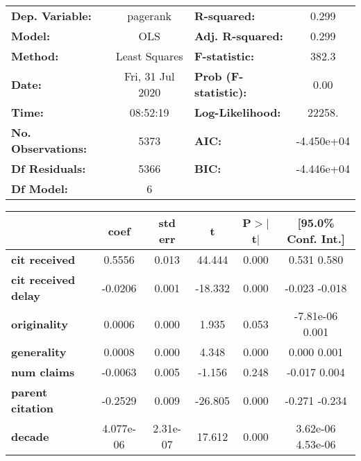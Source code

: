 \begin{center}
\begin{tabular}{lclc}
\toprule
\textbf{Dep. Variable:}     &     pagerank     & \textbf{  R-squared:         } &      0.299    \\
\textbf{Model:}             &       OLS        & \textbf{  Adj. R-squared:    } &      0.299    \\
\textbf{Method:}            &  Least Squares   & \textbf{  F-statistic:       } &      382.3    \\
\textbf{Date:}              & Fri, 31 Jul 2020 & \textbf{  Prob (F-statistic):} &      0.00     \\
\textbf{Time:}              &     08:52:19     & \textbf{  Log-Likelihood:    } &     22258.    \\
\textbf{No. Observations:}  &        5373      & \textbf{  AIC:               } &  -4.450e+04   \\
\textbf{Df Residuals:}      &        5366      & \textbf{  BIC:               } &  -4.446e+04   \\
\textbf{Df Model:}          &           6      & \textbf{                     } &               \\
\bottomrule
\end{tabular}
\begin{tabular}{lccccc}
                            & \textbf{coef} & \textbf{std err} & \textbf{t} & \textbf{P$>$$|$t$|$} & \textbf{[95.0\% Conf. Int.]}  \\
\midrule
\textbf{cit received}       &       0.5556  &        0.013     &    44.444  &         0.000        &         0.531     0.580       \\
\textbf{cit received delay} &      -0.0206  &        0.001     &   -18.332  &         0.000        &        -0.023    -0.018       \\
\textbf{originality}        &       0.0006  &        0.000     &     1.935  &         0.053        &     -7.81e-06     0.001       \\
\textbf{generality}         &       0.0008  &        0.000     &     4.348  &         0.000        &         0.000     0.001       \\
\textbf{num claims}         &      -0.0063  &        0.005     &    -1.156  &         0.248        &        -0.017     0.004       \\
\textbf{parent citation}    &      -0.2529  &        0.009     &   -26.805  &         0.000        &        -0.271    -0.234       \\
\textbf{decade}             &    4.077e-06  &     2.31e-07     &    17.612  &         0.000        &      3.62e-06  4.53e-06       \\

\end{tabular}
\end{center}
